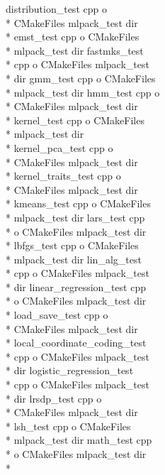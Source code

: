 \begin{DoxyCompactItemize}
distribution\-\_\-test cpp o \\*
C\-Make\-Files mlpack\-\_\-test dir \\*
emst\-\_\-test cpp o C\-Make\-Files \\*
mlpack\-\_\-test dir fastmks\-\_\-test \\*
cpp o C\-Make\-Files mlpack\-\_\-test \\*
dir gmm\-\_\-test cpp o C\-Make\-Files \\*
mlpack\-\_\-test dir hmm\-\_\-test cpp o \\*
C\-Make\-Files mlpack\-\_\-test dir \\*
kernel\-\_\-test cpp o C\-Make\-Files \\*
mlpack\-\_\-test dir \\*
kernel\-\_\-pca\-\_\-test cpp o \\*
C\-Make\-Files mlpack\-\_\-test dir \\*
kernel\-\_\-traits\-\_\-test cpp o \\*
C\-Make\-Files mlpack\-\_\-test dir \\*
kmeans\-\_\-test cpp o C\-Make\-Files \\*
mlpack\-\_\-test dir lars\-\_\-test cpp \\*
o C\-Make\-Files mlpack\-\_\-test dir \\*
lbfgs\-\_\-test cpp o C\-Make\-Files \\*
mlpack\-\_\-test dir lin\-\_\-alg\-\_\-test \\*
cpp o C\-Make\-Files mlpack\-\_\-test \\*
dir linear\-\_\-regression\-\_\-test cpp \\*
o C\-Make\-Files mlpack\-\_\-test dir \\*
load\-\_\-save\-\_\-test cpp o \\*
C\-Make\-Files mlpack\-\_\-test dir \\*
local\-\_\-coordinate\-\_\-coding\-\_\-test \\*
cpp o C\-Make\-Files mlpack\-\_\-test \\*
dir logistic\-\_\-regression\-\_\-test \\*
cpp o C\-Make\-Files mlpack\-\_\-test \\*
dir lrsdp\-\_\-test cpp o \\*
C\-Make\-Files mlpack\-\_\-test dir \\*
lsh\-\_\-test cpp o C\-Make\-Files \\*
mlpack\-\_\-test dir math\-\_\-test cpp \\*
o C\-Make\-Files mlpack\-\_\-test dir \\*

\end{DoxyCompactItemize}
